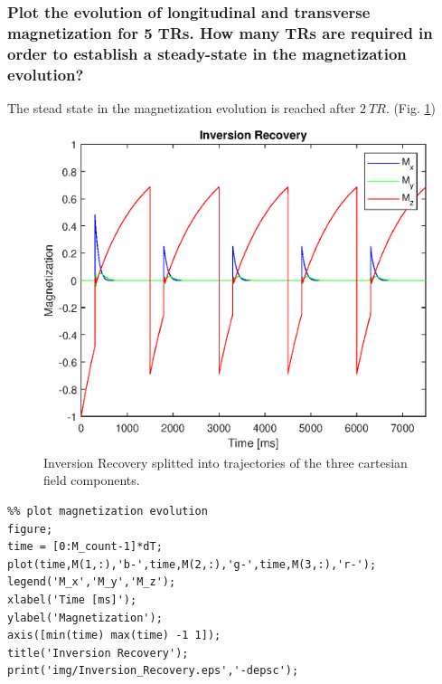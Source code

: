 \subsubsection{Plot the evolution of longitudinal and transverse magnetization for 5 TRs. How many
TRs are required in order to establish a steady-state in the magnetization evolution?}
The stead state in the magnetization evolution is reached after $2\ TR$. (Fig. \ref{fig:inv_rec})
\begin{figure}[h!]
\centering
    \includegraphics[width=\linewidth]{./homework4/img/Inversion_Recovery.eps}
    \caption{Inversion Recovery splitted into trajectories of the three cartesian field components.}
    \label{fig:inv_rec}
\end{figure}



\begin{lstlisting}
%% plot magnetization evolution
figure;
time = [0:M_count-1]*dT;
plot(time,M(1,:),'b-',time,M(2,:),'g-',time,M(3,:),'r-');
legend('M_x','M_y','M_z');
xlabel('Time [ms]');
ylabel('Magnetization');
axis([min(time) max(time) -1 1]);
title('Inversion Recovery');
print('img/Inversion_Recovery.eps','-depsc');
\end{lstlisting}


